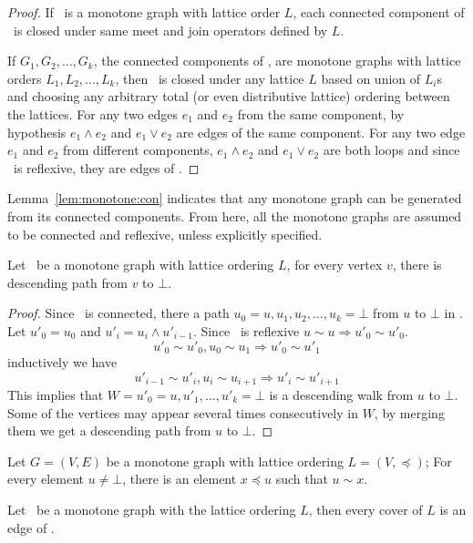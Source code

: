 \begin{proof}
If \mG\ is a monotone graph with lattice order \(L\), each connected component of \mG\ is
closed under same meet and join operators defined by \(L\)\@.

If \(G_1,G_2,\dotsc,G_k\), the connected components of \mG, are
monotone graphs with lattice orders \(L_1,L_2,\dotsc,L_k\),
then \mG\ is closed under any lattice \(L\) based on union of \(L_i\)s
and choosing any arbitrary total (or even distributive lattice) ordering between the
lattices. For any two edges \(e_1\) and \(e_2\) from the same component,
by hypothesis \(e_1\wedge e_2\) and \(e_1\vee e_2\) are
edges of the same component.
For any two edge \(e_1\) and \(e_2\) from different components,
\(e_1\wedge e_2\) and \(e_1\vee e_2\) are both loops and since \mG\ is reflexive,
they are edges of \mG\@.
\end{proof}

Lemma~\ref{lem:monotone:con} indicates that any monotone graph can be generated
from its connected components. From here, all the monotone graphs are
assumed to be connected and reflexive, unless explicitly specified.

\begin{lemma}
Let \mG\ be a monotone graph with lattice ordering \(L\),
for every vertex \(v\), there is descending path from
\(v\) to \(\bot\)\@.
\end{lemma}

\begin{proof}
Since \mG\ is connected, there a path \(u_0=u,u_1,u_2,\dotsc,u_k=\bot\) from \(u\) to 
\(\bot\) in \mG\@. Let \(u'_0=u_0\) and \(u'_i = u_i\wedge u'_{i-1}\)\@.
Since \mG\ is reflexive \(u\sim u \Rightarrow u'_0\sim u'_0\)\@.
\[u'_0\sim u'_0, u_0\sim u_1 \Rightarrow u'_0\sim u'_1\]
inductively we have
\[u'_{i-1}\sim u'_i, u_i\sim u_{i+1} \Rightarrow u'_i\sim u'_{i+1} \]
This implies that \(W=u'_0=u,u'_1,\dotsc,u'_k=\bot\) is a descending walk from 
\(u\) to \(\bot\)\@. Some of the vertices may appear several times consecutively in \(W\),
by merging them we get a descending path from \(u\) to \(\bot\)\@.
\end{proof}

\begin{cor}
Let \(G=(V,E)\) be a monotone graph with lattice ordering \(L=(V,\preceq)\); 
For every element \(u \neq \bot\),
there is an element \(x \preceq u\) such that \(u\sim x\)\@.
\end{cor}

\begin{lemma}
Let \mG\ be a monotone graph with the lattice ordering \(L\), then every cover
of \(L\) is an edge of \mG\@.
\end{lemma}

